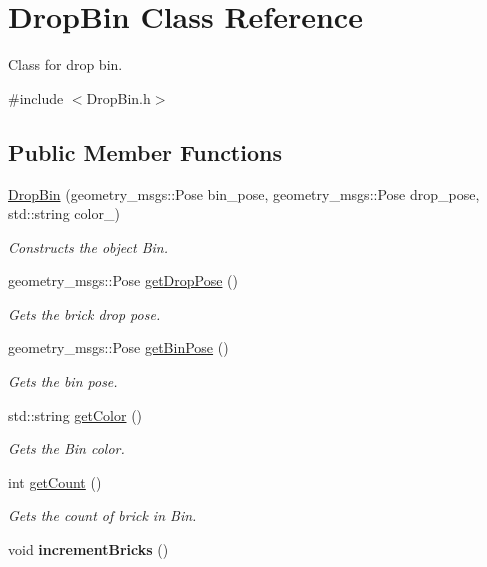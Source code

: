 \hypertarget{classDropBin}{}\section{Drop\+Bin Class Reference}
\label{classDropBin}


Class for drop bin.  




{\ttfamily \#include $<$Drop\+Bin.\+h$>$}

\subsection*{Public Member Functions}
\begin{DoxyCompactItemize}
\item 
\hyperlink{classDropBin_a622683a96da91cd008124f71743ab890}{Drop\+Bin} (geometry\+\_\+msgs\+::\+Pose bin\+\_\+pose, geometry\+\_\+msgs\+::\+Pose drop\+\_\+pose, std\+::string color\+\_\+)
\begin{DoxyCompactList}\small\item\em Constructs the object Bin. \end{DoxyCompactList}\item 
geometry\+\_\+msgs\+::\+Pose \hyperlink{classDropBin_a7608b4550017250f32b6b5ec24282fdd}{get\+Drop\+Pose} ()
\begin{DoxyCompactList}\small\item\em Gets the brick drop pose. \end{DoxyCompactList}\item 
geometry\+\_\+msgs\+::\+Pose \hyperlink{classDropBin_a876f91e4c479dab353f131a92d6d9c8b}{get\+Bin\+Pose} ()
\begin{DoxyCompactList}\small\item\em Gets the bin pose. \end{DoxyCompactList}\item 
std\+::string \hyperlink{classDropBin_a8954360f28933623cc050aa3edea67f0}{get\+Color} ()
\begin{DoxyCompactList}\small\item\em Gets the Bin color. \end{DoxyCompactList}\item 
int \hyperlink{classDropBin_a5cbbaceb974f690971f9f65a50eb4b51}{get\+Count} ()
\begin{DoxyCompactList}\small\item\em Gets the count of brick in Bin. \end{DoxyCompactList}\item 
void {\bfseries increment\+Bricks} ()\hypertarget{classDropBin_ae74185d34f1c3d0154c5bfd816a5561f}{}\label{classDropBin_ae74185d34f1c3d0154c5bfd816a5561f}

\end{DoxyCompactItemize}


